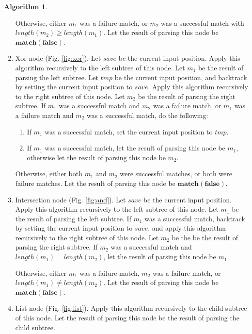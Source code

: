 \documentclass[a4paper,oneside,11pt]{book}
\theoremstyle{definition}
\newtheorem{algo}{Algorithm}[section]
\begin{document}
\begin{algo}
\begin{flushleft}
\begin{enumerate}
Otherwise, either $m_1$ was a failure match, or $m_2$ was a successful match with $length(m_2) \ge length(m_1)$.
Let the result of parsing this node be $\textbf{match}(\textbf{false})$.

\item
Xor node (Fig. \ref{fig:xor}). Let $save$ be the current input position. Apply this algorithm recursively to the left subtree of this node.
Let $m_1$ be the result of parsing the left subtree.
Let $tmp$ be the current input position, and backtrack by setting the current input position to $save$.
Apply this algorithm recursively to the right subtree of this node.
Let $m_2$ be the result of parsing the right subtree.
If $m_1$ was a successful match and $m_2$ was a failure match, or $m_1$ was a failure match and $m_2$ was a successful match,
do the following:
\begin{enumerate}
\item
If $m_1$ was a successful match, set the current input position to $tmp$.
\item
If $m_1$ was a successful match, let the result of parsing this node be $m_1$, otherwise let the result of parsing this node be $m_2$.
\end{enumerate}

Otherwise, either both $m_1$ and $m_2$ were successful matches, or both were failure matches.
Let the result of parsing this node be $\textbf{match}(\textbf{false})$.

\item
Intersection node (Fig. \ref{fig:and}).
Let $save$ be the current input position. Apply this algorithm recursively to the left subtree of this node.
Let $m_1$ be the result of parsing the left subtree.
If $m_1$ was a successful match, backtrack by setting the current input position to $save$,
and apply this algorithm recursively to the right subtree of this node.
Let $m_2$ be the be the result of parsing the right subtree.
If $m_2$ was a successful match and $length(m_1) = length(m_2)$, let the result of parsing this node be $m_1$.

Otherwise, either $m_1$ was a failure match, $m_2$ was a failure match, or $length(m_1) \ne length(m_2)$.
Let the result of parsing this node be $\textbf{match}(\textbf{false})$.

\item
List node (Fig. \ref{fig:list}). Apply this algorithm recursively to the child subtree of this node.
Let the result of parsing this node be the result of parsing the child subtree.


\end{enumerate}
\end{flushleft}
\end{algo}
\end{document}
